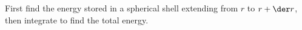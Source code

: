 First find the energy stored in a spherical shell extending
from $r$ to $r+\der r$, then integrate to find the total
energy.
